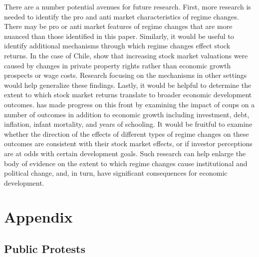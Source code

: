 \documentclass[12pt,final,fleqn]{article}
\theoremstyle{plain}
\begin{document}
There are a number potential avenues for future research. First, more research is needed to identify the pro and anti market characteristics of regime changes. There may be pro or anti market features of regime changes that are more nuanced than those identified in this paper. Similarly, it would be useful to identify additional mechanisms through which regime changes effect stock returns. In the case of Chile,  \citet{girardi2018institution} show that increasing stock market valuations were caused by changes in private property rights rather than economic growth prospects or wage costs. Research focusing on the mechanisms in other settings would help generalize these findings. Lastly, it would be helpful to determine the extent to which stock market returns translate to broader economic development outcomes. \citet{meyersson2016political} has made progress on this front by examining the impact of coups on a number of outcomes in addition to economic growth including investment, debt, inflation, infant mortality, and years of schooling. It would be fruitful to examine whether the direction of the effects of different types of regime changes on these outcomes are consistent with their stock market effects, or if investor perceptions are at odds with certain development goals. Such research can help enlarge the body of evidence on the extent to which regime changes cause institutional and political change, and, in turn, have significant consequences for economic development.

\clearpage
\pagebreak





\newpage
\appendix
\setcounter{secnumdepth}{1}
\setcounter{table}{0}
\setcounter{figure}{0}
\renewcommand\thetable{\Alph{section}.\arabic{table}}
\renewcommand\thefigure{\Alph{section}.\arabic{figure}}

\section{Appendix} \label{sec: appendix}


\subsection{Public Protests} \label{subsec: Public Protests}
\end{document}
